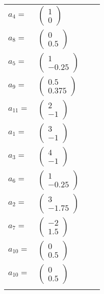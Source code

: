 \documentclass[1p]{elsarticle_modified}
\theoremstyle{definition}
\begin{document}
\begin{tabular}{m{7pt} m{180pt} m{7pt} m{180pt} }
\flushright $a_{4}=$&$\begin{pmatrix}1\\0\end{pmatrix}$ \\
\flushright $a_{8}=$&$\begin{pmatrix}0\\0.5\end{pmatrix}$ \\
\flushright $a_{5}=$&$\begin{pmatrix}1\\-0.25\end{pmatrix}$ \\
\flushright $a_{9}=$&$\begin{pmatrix}0.5\\0.375\end{pmatrix}$ \\
\flushright $a_{11}=$&$\begin{pmatrix}2\\-1\end{pmatrix}$ \\
\flushright $a_{1}=$&$\begin{pmatrix}3\\-1\end{pmatrix}$ \\
\flushright $a_{3}=$&$\begin{pmatrix}4\\-1\end{pmatrix}$ \\
\flushright $a_{6}=$&$\begin{pmatrix}1\\-0.25\end{pmatrix}$ \\
\flushright $a_{2}=$&$\begin{pmatrix}3\\-1.75\end{pmatrix}$ \\
\flushright $a_{7}=$&$\begin{pmatrix}-2\\1.5\end{pmatrix}$ \\
\flushright $a_{10}=$&$\begin{pmatrix}0\\0.5\end{pmatrix}$\\ \flushright $a_{10}=$&$\begin{pmatrix}0\\0.5\end{pmatrix}$\\&\end{tabular}
\end{document}
